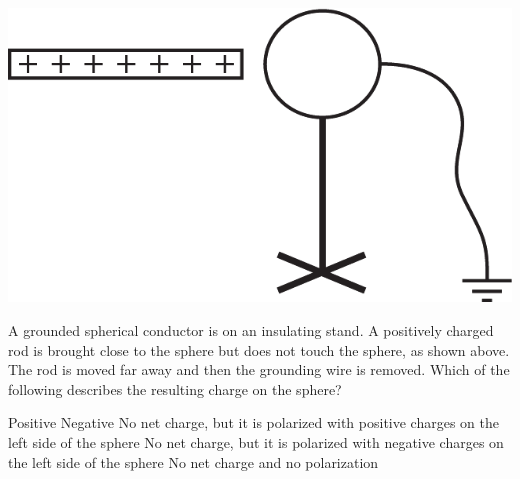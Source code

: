 
\begin{center}
    \includegraphics[scale=0.25]{images/img-002-000.png}
\end{center}

\begin{questions}
\setcounter{question}{1}

\question
A grounded spherical conductor is on an insulating stand. A positively charged rod is brought close to the sphere but does not touch the sphere, as shown above. The rod is moved far away and then the grounding wire is removed. Which of the following describes the resulting charge on the sphere?

\begin{choices}
    \choice Positive
    \choice Negative
    \choice No net charge, but it is polarized with positive charges on the left side of the sphere
    \choice No net charge, but it is polarized with negative charges on the left side of the sphere
    \choice No net charge and no polarization
\end{choices}

\end{questions}
